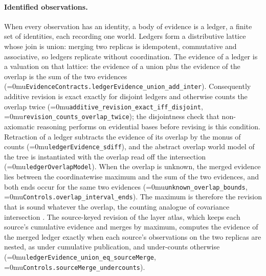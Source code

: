 \documentclass[11pt]{article}
\newcommand{\leanname}[1]{\textup{\Urlmuskip=0mu\relax\nolinkurl{#1}}}
\theoremstyle{definition}
\theoremstyle{remark}
\begin{document}
\paragraph{Identified observations.}
When every observation has an identity, a body of evidence is a ledger, a
finite set of identities, each recording one world.  Ledgers form a
distributive lattice whose join is union: merging two replicas is idempotent,
commutative and associative, so ledgers replicate without coordination.  The
evidence of a ledger is a valuation on that lattice: the evidence of a union
plus the evidence of the overlap is the sum of the two evidences
(\leanname{EvidenceContracts.ledgerEvidence_union_add_inter}).  Consequently
additive revision is exact exactly for disjoint ledgers and otherwise counts
the overlap twice (\leanname{additive_revision_exact_iff_disjoint},
\leanname{revision_counts_overlap_twice}); the disjointness check that
non-axiomatic reasoning performs on evidential bases before revising
\cite{WangNAL} is this condition.  Retraction of a ledger subtracts the
evidence of its overlap by the monus of counts (\leanname{ledgerEvidence_sdiff}),
and the abstract overlap world model of the tree is instantiated with the
overlap read off the intersection (\leanname{ledgerOverlapModel}).  When the
overlap is unknown, the merged evidence lies between the coordinatewise
maximum and the sum of the two evidences, and both ends occur for the same two
evidences (\leanname{unknown_overlap_bounds},
\leanname{Controls.overlap_interval_ends}).  The maximum is therefore the
revision that is sound whatever the overlap, the counting analogue of
covariance intersection \cite{JulierUhlmannCI}.  The source-keyed revision of
the layer atlas, which keeps each source's cumulative evidence and merges by
maximum, computes the evidence of the merged ledger exactly when each
source's observations on the two replicas are nested, as under cumulative
publication, and under-counts otherwise
(\leanname{ledgerEvidence_union_eq_sourceMerge},
\leanname{Controls.sourceMerge_undercounts}).
\end{document}
